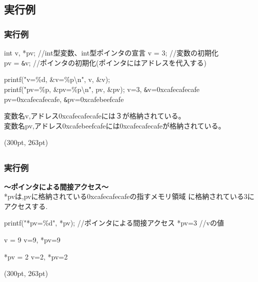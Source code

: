 \documentclass[dvipdfmx]{beamer}
\begin{document}
\subsection{実行例}
\begin{frame}[c, fragile]
    \frametitle{実行例}
    \begin{block}{int v, *pv; //int型変数、int型ポインタの宣言}
        v = 3; //変数の初期化\\
        pv = \verb|&|v; //ポインタの初期化(ポインタにはアドレスを代入する)
    \end{block}
    \begin{block}{%
            printf("v=\%d, \&v=\%p\textbackslash n", v, \&v);\\
            printf("pv=\%p, \&pv=\%p\textbackslash n", pv, \&pv);
        }
        v=3, \verb|&|v=0xcafecafecafe\\
        pv=0xcafecafecafe, \verb|&|pv=0xcafebeefcafe
    \end{block}
    変数名v,アドレス0xcafecafecafeには３が格納されている。\\
    変数名pv,アドレス0xcafebeefcafeには0xcafecafecafeが格納されている。
    \begin{textblock*}{0.3\linewidth}(300pt, 263pt)
        \space
    \end{textblock*}
\end{frame}

\subsection{}
\begin{frame}[t, fragile]
    \frametitle{実行例}
    \textbf{～ポインタによる間接アクセス～}\\
    *pvは,pvに格納されている0xcafecafecafeの指すメモリ領域
    に格納されている3にアクセスする.
    \begin{block}{printf("*pv=\%d", *pv); //ポインタによる間接アクセス}
        *pv=3 //vの値
    \end{block}
    \begin{block}{v = 9}
        v=9, *pv=9
    \end{block}
    \begin{block}{*pv = 2}
        v=2, *pv=2
    \end{block}
    \begin{textblock*}{0.3\linewidth}(300pt, 263pt)
        \space
    \end{textblock*}
\end{frame}
\end{document}
